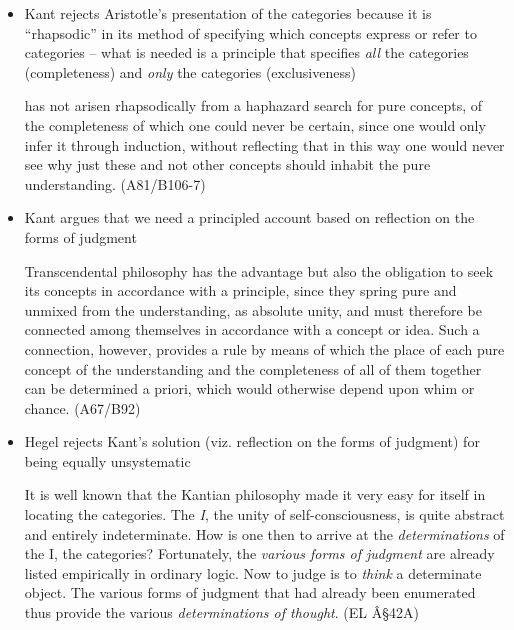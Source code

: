 \documentclass[12pt]{article}
\begin{document}
\begin{itemize}
\item Kant rejects Aristotle's presentation of the categories because it is
``rhapsodic'' in its method of specifying which concepts express or refer to
categories -- what is needed is a principle that specifies \emph{all} the
categories (completeness) and \emph{only} the categories (exclusiveness) 

\begin{quote-b}
 has not arisen rhapsodically
from a haphazard search for pure concepts, of the completeness of which one
could never be certain, since one would only infer it through induction,
without reflecting that in this way one would never see why just these and
not other concepts should inhabit the pure understanding. (A81/B106-7)
\end{quote-b}

\item Kant argues that we need a principled account based on reflection on the
forms of judgment

\begin{quote-b}
Transcendental philosophy has the advantage but also the obligation to seek
its concepts in accordance with a principle, since they spring pure and
unmixed from the understanding, as absolute unity, and must therefore be
connected among themselves in accordance with a concept or idea. Such a
connection, however, provides a rule by means of which the place of each
pure concept of the understanding and the completeness of all of them
together can be determined a priori, which would otherwise depend upon whim
or chance. (A67/B92)
\end{quote-b}

\item Hegel rejects Kant's solution (viz. reflection on the forms of judgment) for
being equally unsystematic

\begin{quote-b}
It is well known that the Kantian philosophy made it very easy for itself in
locating the categories. The \emph{I}, the unity of self-consciousness, is quite
abstract and entirely indeterminate. How is one then to arrive at the
\emph{determinations} of the I, the categories? Fortunately, the \emph{various forms of
judgment} are already listed empirically in ordinary logic. Now to judge is
to \emph{think} a determinate object. The various forms of judgment that had
already been enumerated thus provide the various \emph{determinations of thought}.
(EL Â§42A)
\end{quote-b}


\end{itemize}
\end{document}
